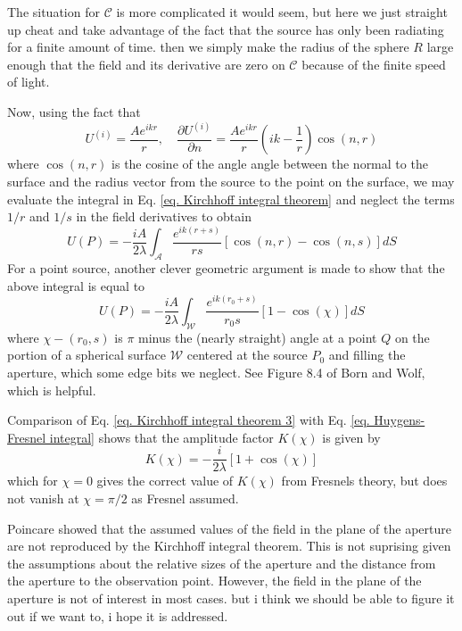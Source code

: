 \documentclass[../../main.tex]{subfiles} %
\begin{document}
The situation for $\mathcal{C}$ is more complicated it would seem, but here we just straight up cheat and take advantage of the fact that the source has only been radiating for a finite amount of time.  then we simply make the radius of the sphere $R$ large enough that the field and its derivative are zero on $\mathcal{C}$ because of the finite speed of light. 

Now, using the fact that 
\begin{equation}\label{eq. spherical wave field and derivative components}
    U^{(i)}=\frac{Ae^{ikr}}{r}, \quad \frac{\partial U^{(i)}}{\partial n}=\frac{Ae^{ikr}}{r}\left(ik-\frac{1}{r}\right)\cos(n,r)
\end{equation}
where $\cos(n,r)$ is the cosine of the angle angle between the normal to the surface and the radius vector from the source to the point on the surface, we may evaluate the integral in Eq. \ref{eq. Kirchhoff integral theorem} and neglect the terms $1/r$ and $1/s$ in the field derivatives to obtain
\begin{equation} \label{eq. Kirchhoff integral theorem 2}
    U(P)=-\frac{iA}{2\lambda}\int_{\mathcal{A}}\frac{e^{ik(r+s)}}{rs}[\cos(n,r)-\cos(n,s)]dS
\end{equation}
For a point source, another clever geometric argument is made to show that the above integral is equal to
\begin{equation} \label{eq. Kirchhoff integral theorem 3}
    U(P)=-\frac{iA}{2\lambda}\int_{\mathcal{W}}\frac{e^{ik(r_0+s)}}{r_0s}[1-\cos(\chi)]dS
\end{equation}
where $\chi-(r_0,s)$ is $\pi$ minus the (nearly straight) angle at a point $Q$ on the portion of a spherical surface $\mathcal{W}$  centered at the source $P_0$ and filling the aperture, which some edge bits we neglect. See Figure 8.4 of Born and Wolf, which is helpful.

Comparison of Eq. \ref{eq. Kirchhoff integral theorem 3} with Eq. \ref{eq. Huygens-Fresnel integral} shows that the amplitude factor $K(\chi)$ is given by 
\begin{equation} 
    K(\chi)=-\frac{i}{2\lambda}[1+\cos(\chi)]
\end{equation}
which for $\chi=0$ gives the correct value of $K(\chi)$ from Fresnels theory, but does not vanish at $\chi=\pi/2$ as Fresnel assumed.

Poincare showed that the assumed values of the field in the plane of the aperture are not reproduced by the Kirchhoff integral theorem. This is not suprising given the assumptions about the relative sizes of the aperture and the distance from the aperture to the observation point. However, the field in the plane of the aperture is not of interest in most cases. but i think we should be able to figure it out if we want to, i hope it is addressed.
\end{document}
